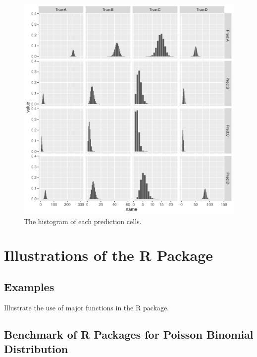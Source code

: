 \documentclass[12pt]{article}
\begin{document}
\begin{figure}
	\centering
	\includegraphics[scale=1.0]{figures/Confusionbar.pdf}
	\caption{The histogram of each prediction cells.}
	\label{fig:confusion.hist}
\end{figure}
\section{Illustrations of the R Package}
\subsection{Examples}
Illustrate the use of major functions in the R package.


\subsection{Benchmark of R Packages for Poisson Binomial Distribution}



\end{document}
